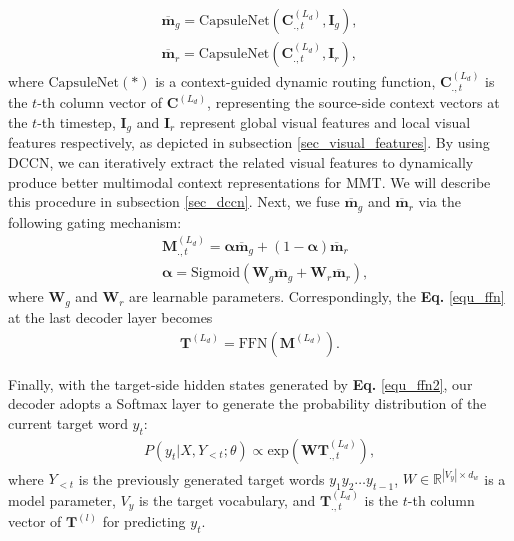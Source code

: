 \documentclass[sigconf]{acmart}
\begin{document}
\begin{align}
\mathbf{\overline{m}}_{g} = \mathrm{CapsuleNet}(\mathbf{C}_{.,t}^{(L_d)},\mathbf{I}_g), \\
\mathbf{\overline{m}}_{r} = \mathrm{CapsuleNet}(\mathbf{C}_{.,t}^{(L_d)},\mathbf{I}_r),
\end{align}
where $\mathrm{CapsuleNet}(*)$ is a context-guided dynamic routing function, $\mathbf{C}_{.,t}^{(L_d)}$ is the $t$-th column vector of $\mathbf{C}^{(L_d)}$, representing the source-side context vectors at the $t$-th timestep,  $\mathbf{I}_g$ and $\mathbf{I}_r$ represent global visual features and local visual features respectively, as depicted in subsection \ref{sec_visual_features}. 
By using DCCN, we can iteratively extract the related visual features to dynamically produce better multimodal context representations for MMT. We will describe this procedure in subsection \ref{sec_dccn}. 
Next, we fuse $\mathbf{\overline{m}}_{g}$ and $\mathbf{\overline{m}}_{r}$ via the following gating mechanism: 
\begin{align}
&\mathbf{M}_{.,t}^{(L_d)} = \mathbf{\alpha}\mathbf{\overline{m}}_{g} + (1-\mathbf{\alpha})\mathbf{\overline{m}}_{r} \\
&\mathbf{\alpha} = \text{Sigmoid}(\mathbf{W}_g\mathbf{\overline{m}}_{g}+\mathbf{W}_r\mathbf{\overline{m}}_{r}),
\end{align}
where $\mathbf{W}_{g}$ and $\mathbf{W}_r$ are learnable parameters. 
Correspondingly, the \textbf{Eq.} \ref{equ_ffn} at the last decoder layer becomes 
\begin{align}
\mathbf{T}^{(L_d)} = \mathrm{FFN}(\mathbf{M}^{(L_d)}). \label{equ_ffn2}
\end{align}

Finally, with the target-side hidden states generated by \textbf{Eq.} \ref{equ_ffn2}, 
our decoder adopts a Softmax layer to generate the probability distribution of the current target word $y_{t}$:
\begin{align}
P(y_{t}|X,Y_{<t};\theta)\propto\mathrm{exp}(\mathbf{WT}^{(L_{d})}_{.,t}),
\end{align}
where $Y_{<t}$ is the previously generated target words ${y_1}{y_2}\dots{y_{t-1}}$, $W$$\in$$\mathbb{R}^{|V_{y}|\times d_w}$ is a model parameter, $V_{y}$ is the target vocabulary, 
and $\mathbf{T}^{(L_{d})}_{.,t}$ is the $t$-th column vector of $\mathbf{T}^{(l)}$ for predicting $y_t$.
\end{document}
